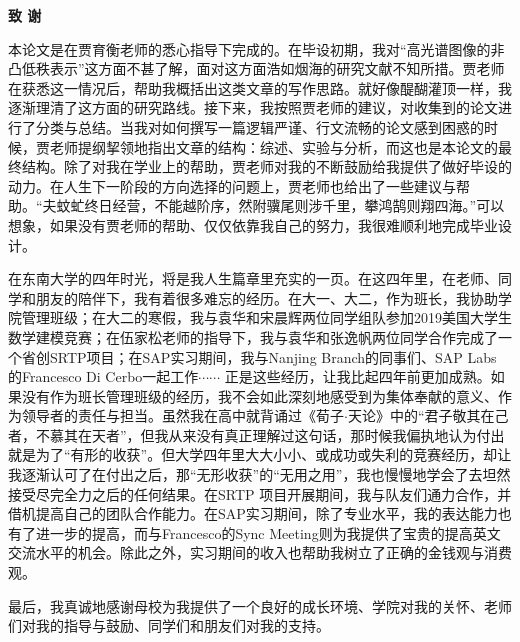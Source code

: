 \documentclass[12pt, a4paper]{article}
\begin{document}
\newpage
\begin{center}
{\Large{\bf{致 \quad 谢}}}
\end{center}
\par 本论文是在贾育衡老师的悉心指导下完成的。在毕设初期，我对“高光谱图像的非凸低秩表示”这方面不甚了解，面对这方面浩如烟海的研究文献不知所措。贾老师在获悉这一情况后，帮助我概括出这类文章的写作思路。就好像醍醐灌顶一样，我逐渐理清了这方面的研究路线。接下来，我按照贾老师的建议，对收集到的论文进行了分类与总结。当我对如何撰写一篇逻辑严谨、行文流畅的论文感到困惑的时候，贾老师提纲挈领地指出文章的结构：综述、实验与分析，而这也是本论文的最终结构。除了对我在学业上的帮助，贾老师对我的不断鼓励给我提供了做好毕设的动力。在人生下一阶段的方向选择的问题上，贾老师也给出了一些建议与帮助。“夫蚊虻终日经营，不能越阶序，然附骥尾则涉千里，攀鸿鹄则翔四海。”可以想象，如果没有贾老师的帮助、仅仅依靠我自己的努力，我很难顺利地完成毕业设计。
\par 在东南大学的四年时光，将是我人生篇章里充实的一页。在这四年里，在老师、同学和朋友的陪伴下，我有着很多难忘的经历。在大一、大二，作为班长，我协助学院管理班级；在大二的寒假，我与袁华和宋晨辉两位同学组队参加2019美国大学生数学建模竞赛；在伍家松老师的指导下，我与袁华和张逸帆两位同学合作完成了一个省创SRTP项目；在SAP实习期间，我与Nanjing Branch的同事们、SAP Labs 的Francesco Di Cerbo一起工作$\cdots\cdots$ 正是这些经历，让我比起四年前更加成熟。如果没有作为班长管理班级的经历，我不会如此深刻地感受到为集体奉献的意义、作为领导者的责任与担当。虽然我在高中就背诵过《荀子$\cdot$天论》中的“君子敬其在己者，不慕其在天者”，但我从来没有真正理解过这句话，那时候我偏执地认为付出就是为了“有形的收获”。但大学四年里大大小小、或成功或失利的竞赛经历，却让我逐渐认可了在付出之后，那“无形收获”的“无用之用”，我也慢慢地学会了去坦然接受尽完全力之后的任何结果。在SRTP 项目开展期间，我与队友们通力合作，并借机提高自己的团队合作能力。在SAP实习期间，除了专业水平，我的表达能力也有了进一步的提高，而与Francesco的Sync Meeting则为我提供了宝贵的提高英文交流水平的机会。除此之外，实习期间的收入也帮助我树立了正确的金钱观与消费观。
\par 最后，我真诚地感谢母校为我提供了一个良好的成长环境、学院对我的关怀、老师们对我的指导与鼓励、同学们和朋友们对我的支持。
\end{document}
